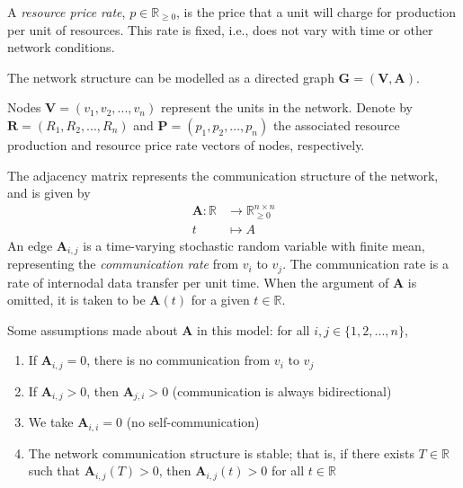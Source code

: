 \documentclass[../mthe-493-project-proposal.tex]{subfiles}
\begin{document}
    A \textit{resource price rate}, $p \in \mathbb{R}_{\geq 0}$, is the price that a unit will charge for production per unit of resources. This rate is fixed, i.e., does not vary with time or other network conditions.

    The network structure can be modelled as a directed graph $\mathbf{G} = (\mathbf{V}, \mathbf{A})$.

    Nodes $\mathbf{V} = (v_1, v_2, ..., v_n)$ represent the units in the network. Denote by $\mathbf{R} = (R_1, R_2, ..., R_n)$ and $\mathbf{P} = (p_1, p_2, ..., p_n)$ the associated resource production and resource price rate vectors of nodes, respectively.

    The adjacency matrix represents the communication structure of the network, and is given by
    \begin{align*}
        \mathbf{A} \colon \mathbb{R} &\to \mathbb{R}^{n \times n}_{\geq 0} \\
        t                            &\mapsto A
    \end{align*}
    An edge $\mathbf{A}_{i,j}$ is a time-varying stochastic random variable with finite mean, representing the \textit{communication rate} from $v_i$ to $v_j$. The communication rate is a rate of internodal data transfer per unit time. When the argument of $\mathbf{A}$ is omitted, it is taken to be $\mathbf{A}(t)$ for a given $t \in \mathbb{R}$.

    Some assumptions made about $\mathbf{A}$ in this model: for all $i, j \in \{1, 2, ..., n\}$,
    \begin{enumerate}
        \item If $\mathbf{A}_{i,j} = 0$, there is no communication from $v_i$ to $v_j$
        \item If $\mathbf{A}_{i,j} > 0$, then $\mathbf{A}_{j,i} > 0$ (communication is always bidirectional)
        \item We take $\mathbf{A}_{i,i} = 0$ (no self-communication)
        \item The network communication structure is stable; that is, if there exists $T \in \mathbb{R}$ such that $\mathbf{A}_{i,j}(T) > 0$, then $\mathbf{A}_{i,j}(t) > 0$ for all $t \in \mathbb{R}$
    \end{enumerate}
\end{document}
